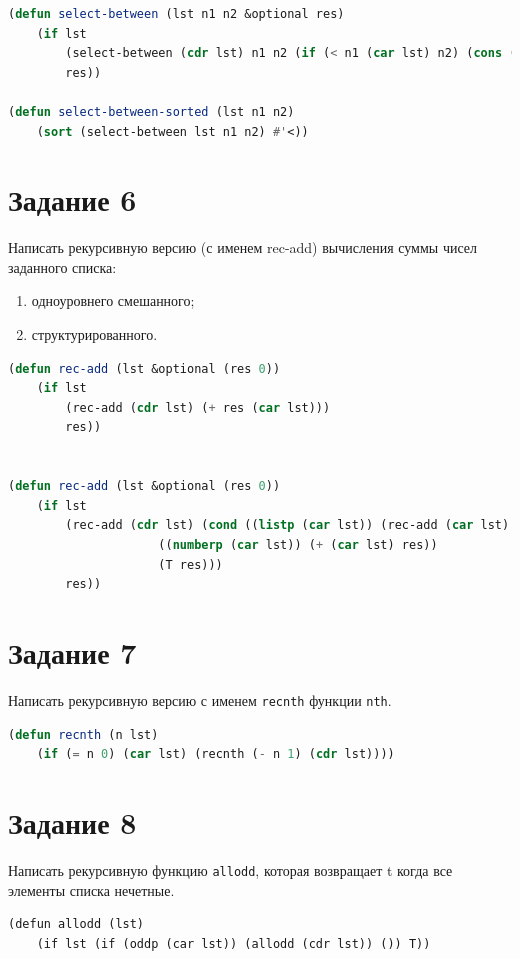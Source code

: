 \documentclass[12pt]{report}
\begin{document}
\begin{lstlisting}[language=Lisp]
(defun select-between (lst n1 n2 &optional res)
	(if lst
		(select-between (cdr lst) n1 n2 (if (< n1 (car lst) n2) (cons (car lst) res) res))
		res)) 

(defun select-between-sorted (lst n1 n2)
  	(sort (select-between lst n1 n2) #'<))

\end{lstlisting}


\section*{Задание 6}
Написать рекурсивную версию (с именем rec-add) вычисления суммы чисел заданного
списка:
\begin{enumerate}
	\item одноуровнего смешанного;
	\item структурированного.
\end{enumerate}


\begin{lstlisting}[language=Lisp]
(defun rec-add (lst &optional (res 0))
	(if lst
		(rec-add (cdr lst) (+ res (car lst)))
		res))
  
		
(defun rec-add (lst &optional (res 0))
	(if lst
		(rec-add (cdr lst) (cond ((listp (car lst)) (rec-add (car lst) res))
					 ((numberp (car lst)) (+ (car lst) res))
					 (T res)))
		res))

\end{lstlisting}






\section*{Задание 7}
Написать рекурсивную версию с именем \texttt{recnth} функции \texttt{nth}.


\begin{lstlisting}[language=Lisp]
(defun recnth (n lst)
	(if (= n 0) (car lst) (recnth (- n 1) (cdr lst))))
\end{lstlisting}



\section*{Задание 8}
Написать рекурсивную функцию \texttt{allodd}, которая возвращает t когда все элементы списка нечетные.

\begin{lstlisting}
(defun allodd (lst)
  	(if lst (if (oddp (car lst)) (allodd (cdr lst)) ()) T))
\end{lstlisting}
\end{document}
